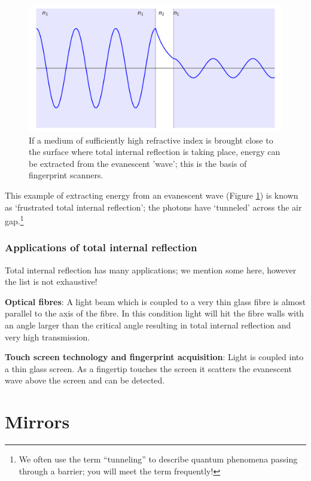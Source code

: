 \documentclass[
]{book}
\begin{document}
\begin{figure}

{\centering \includegraphics[width=0.7\linewidth]{visualisations/ch14-evansecent2} 

}

\caption{If a medium of sufficiently high refractive index is brought close to the surface where total internal reflection is taking place, energy can be extracted from the evanescent 'wave'; this is the basis of fingerprint scanners.}\label{fig:ch14-evanescentwave2}
\end{figure}

This example of extracting energy from an evanescent wave (Figure \ref{fig:ch14-evanescentwave2}) is known as `frustrated total internal reflection'; the photons have `tunneled' across the air gap.\footnote{We often use the term ``tunneling'' to describe quantum phenomena passing through a barrier; you will meet the term frequently!}

\hypertarget{sec-ch14-tirapplications}{%
\subsection{Applications of total internal reflection}\label{sec-ch14-tirapplications}}

Total internal reflection has many applications; we mention some here, however the list is not exhaustive!

\textbf{Optical fibres}: A light beam which is coupled to a very thin glass fibre is almost parallel to the axis of the fibre. In this condition light will hit the fibre walls with an angle larger than the critical angle resulting in total internal reflection and very high transmission.

\textbf{Touch screen technology and fingerprint acquisition}: Light is coupled into a thin glass screen. As a fingertip touches the screen it scatters the evanescent wave above the screen and can be detected.

\hypertarget{sec-ch15-mirrors}{%
\chapter{Mirrors}\label{sec-ch15-mirrors}}
\end{document}
